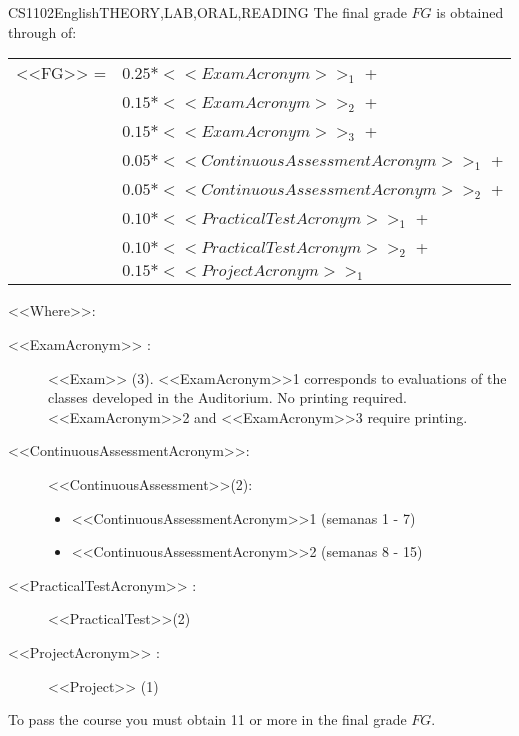   \begin{evaluation}{CS1102}{English}{THEORY,LAB,ORAL,READING}
  The final grade $FG$ is obtained through of:
 
  \begin{tabular}{cl}
    <<FG>> =  & $0.25*<<ExamAcronym>>_{1}$ +\\
              & $0.15*<<ExamAcronym>>_{2}$ +\\
              & $0.15*<<ExamAcronym>>_{3}$ +\\
              & $0.05*<<ContinuousAssessmentAcronym>>_{1}$ +\\
              & $0.05*<<ContinuousAssessmentAcronym>>_{2}$ +\\
              & $0.10*<<PracticalTestAcronym>>_{1}$ +\\
              & $0.10*<<PracticalTestAcronym>>_{2}$ + \\
              & $0.15*<<ProjectAcronym>>_{1}$
  \end{tabular}

  \noindent <<Where>>:
  \begin{description}
      \item[<<ExamAcronym>> :] <<Exam>> (3). <<ExamAcronym>>1 corresponds to evaluations of the classes developed in the Auditorium. No printing required. <<ExamAcronym>>2 and  <<ExamAcronym>>3 require printing.
      \item[<<ContinuousAssessmentAcronym>>:]<<ContinuousAssessment>>(2):
         \begin{itemize}
             \item <<ContinuousAssessmentAcronym>>1 (semanas 1 - 7) 
             \item <<ContinuousAssessmentAcronym>>2 (semanas 8 - 15)
       \end{itemize}
  \item[<<PracticalTestAcronym>> :] <<PracticalTest>>(2)
  \item[<<ProjectAcronym>> :] <<Project>> (1)
  \end{description}
 
  \noindent To pass the course you must obtain 11 or more in the final grade $FG$.
  \end{evaluation}
 
